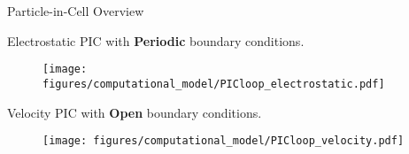 \begin{frame}{Particle-in-Cell Overview}

    \begin{center}
    \begin{overprint}
        \begin{center}
        \item Electrostatic PIC with \textbf{Periodic} boundary conditions.
        \end{center}
        \begin{figure}
            \begin{center}
                \texttt{[image: figures/computational\_model/PICloop\_electrostatic.pdf]}
            \end{center}
            \label{fig:PICloopConfig}
        \end{figure}

        \begin{center}
        \item Velocity PIC with \textbf{Open} boundary conditions.
        \end{center}
        \begin{figure}
            \begin{center}
                \texttt{[image: figures/computational\_model/PICloop\_velocity.pdf]}
            \end{center}
            \label{fig:PICloopVel}
        \end{figure}
    \end{overprint}

    \end{center}
\end{frame}


